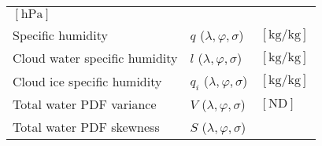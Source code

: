 \begin{longtable}[]{@{}lll@{}}
\begin{minipage}[t]{0.15\columnwidth}
\(\mathrm{[hPa]}\)\strut
\end{minipage}\tabularnewline
\begin{minipage}[t]{0.49\columnwidth}\raggedright
Specific humidity\strut
\end{minipage} & \begin{minipage}[t]{0.27\columnwidth}\raggedright
\(q\) (\(\lambda,\varphi,\sigma\))\strut
\end{minipage} & \begin{minipage}[t]{0.15\columnwidth}\raggedright
\(\mathrm{[kg/kg]}\)\strut
\end{minipage}\tabularnewline
\begin{minipage}[t]{0.49\columnwidth}\raggedright
Cloud water specific humidity\strut
\end{minipage} & \begin{minipage}[t]{0.27\columnwidth}\raggedright
\(l\) (\(\lambda,\varphi,\sigma\))\strut
\end{minipage} & \begin{minipage}[t]{0.15\columnwidth}\raggedright
\(\mathrm{[kg/kg]}\)\strut
\end{minipage}\tabularnewline
\begin{minipage}[t]{0.49\columnwidth}\raggedright
Cloud ice specific humidity\strut
\end{minipage} & \begin{minipage}[t]{0.27\columnwidth}\raggedright
\(q_i\) (\(\lambda,\varphi,\sigma\))\strut
\end{minipage} & \begin{minipage}[t]{0.15\columnwidth}\raggedright
\(\mathrm{[kg/kg]}\)\strut
\end{minipage}\tabularnewline
\begin{minipage}[t]{0.49\columnwidth}\raggedright
Total water PDF variance\strut
\end{minipage} & \begin{minipage}[t]{0.27\columnwidth}\raggedright
\(V\) (\(\lambda,\varphi,\sigma\))\strut
\end{minipage} & \begin{minipage}[t]{0.15\columnwidth}\raggedright
\(\mathrm{[ND]}\)\strut
\end{minipage}\tabularnewline
\begin{minipage}[t]{0.49\columnwidth}\raggedright
Total water PDF skewness\strut
\end{minipage} & \begin{minipage}[t]{0.27\columnwidth}\raggedright
\(S\) (\(\lambda,\varphi,\sigma\))\strut

\end{minipage}
\end{longtable}
